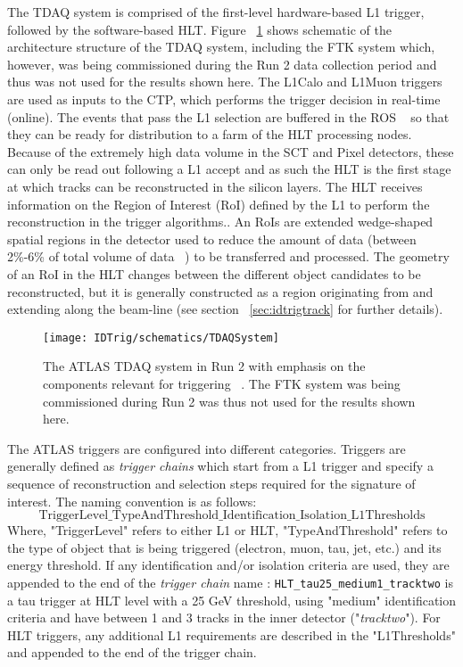   The \ac{TDAQ} system is comprised of the first-level hardware-based \ac{L1} trigger, followed by the software-based \ac{HLT}.  
  Figure ~\ref{fig:TDAQ} shows schematic of the architecture structure of the \ac{TDAQ} system, including the \ac{FTK} system which, however, was being commissioned during the Run 2 data collection period and thus was not used for the results shown here. 
  The \ac{L1Calo} and \ac{L1Muon} triggers are used as inputs to the \ac{CTP}, which performs the trigger decision in real-time (online). 
  The events that pass the \ac{L1} selection are buffered in the \ac{ROS} ~\cite{Jenni:616089} so that they can be ready for distribution to a farm of the \ac{HLT} processing nodes. 
  Because of the extremely high data volume in the \ac{SCT} and Pixel detectors, these can only be read out following a L1 accept and as such the \ac{HLT} is the first stage at which tracks can be reconstructed in the silicon layers.
  The \ac{HLT} receives information on the Region of Interest (\ac{RoI}) defined by the \ac{L1} to perform the reconstruction in the trigger algorithms.. An \ac{RoI}s are extended wedge-shaped spatial regions in the detector used to reduce the amount of data (between 2\%-6\% of total volume of data ~\cite{ATLASmuontrigger}) to be transferred and processed.  
  The geometry of an \ac{RoI} in the \ac{HLT} changes between the different object candidates to be reconstructed, but it is generally constructed as a region originating from and extending along the beam-line (see section ~\ref{sec:idtrigtrack} for further details).
\begin{figure}[!hbt]
\centering
\texttt{[image: IDTrig/schematics/TDAQSystem]}
\caption{The \ac{ATLAS} \ac{TDAQ} system in Run 2 with emphasis on the components relevant for triggering ~\cite{ATLASTrigger2015}. The \ac{FTK} system was being commissioned during Run 2 was thus not used for the results shown here.}
\label{fig:TDAQ}
\end{figure}  
  
  The ATLAS triggers are configured into different categories. Triggers are generally defined as \textit{trigger chains} which start from a \ac{L1} trigger and specify a sequence of reconstruction and selection steps required for the signature of interest. The naming convention is as follows: 
 $$\mathrm{TriggerLevel\_TypeAndThreshold\_Identification\_Isolation\_L1Thresholds}$$
  Where, "TriggerLevel" refers to either \ac{L1} or \ac{HLT}, "TypeAndThreshold" refers to the type of object that is being triggered (electron, muon, tau, jet, etc.) and its energy threshold.
   If any identification and/or isolation criteria are used, they are appended to the end of the \textit{trigger chain} name
    \ie: \texttt{HLT\_tau25\_medium1\_tracktwo} is a tau trigger at \ac{HLT} level with a 25 GeV threshold, using "medium" identification criteria and have between 1 and 3 tracks in the inner detector ("\textit{tracktwo}"). 
    For \ac{HLT} triggers, any additional \ac{L1} requirements are described in the "L1Thresholds" and appended to the end of the trigger chain.
   
